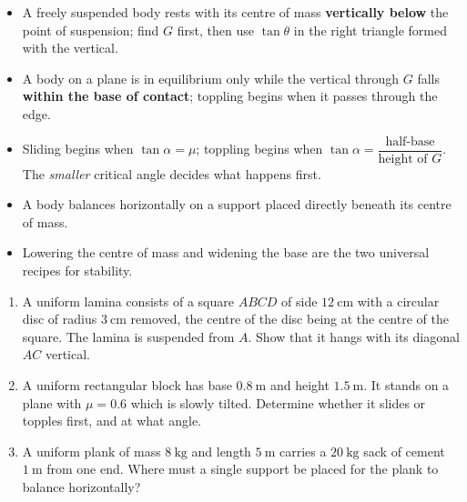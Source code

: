 \documentclass[11pt]{article}
\begin{document}
\begin{aretenir}
\begin{itemize}
\item A freely suspended body rests with its centre of mass \textbf{vertically below} the point of suspension; find $G$ first, then use $\tan\theta$ in the right triangle formed with the vertical.
\item A body on a plane is in equilibrium only while the vertical through $G$ falls \textbf{within the base of contact}; toppling begins when it passes through the edge.
\item Sliding begins when $\tan\alpha = \mu$; toppling begins when $\tan\alpha = \dfrac{\text{half-base}}{\text{height of }G}$. The \emph{smaller} critical angle decides what happens first.
\item A body balances horizontally on a support placed directly beneath its centre of mass.
\item Lowering the centre of mass and widening the base are the two universal recipes for stability.
\end{itemize}
\end{aretenir}

\begin{exercice}
\begin{enumerate}
\item A uniform lamina consists of a square $ABCD$ of side $12\ \mathrm{cm}$ with a circular disc of radius $3\ \mathrm{cm}$ removed, the centre of the disc being at the centre of the square. The lamina is suspended from $A$. Show that it hangs with its diagonal $AC$ vertical.
\item A uniform rectangular block has base $0.8\ \mathrm{m}$ and height $1.5\ \mathrm{m}$. It stands on a plane with $\mu = 0.6$ which is slowly tilted. Determine whether it slides or topples first, and at what angle.
\item A uniform plank of mass $8\ \mathrm{kg}$ and length $5\ \mathrm{m}$ carries a $20\ \mathrm{kg}$ sack of cement $1\ \mathrm{m}$ from one end. Where must a single support be placed for the plank to balance horizontally?
\end{enumerate}
\end{exercice}
\end{document}

